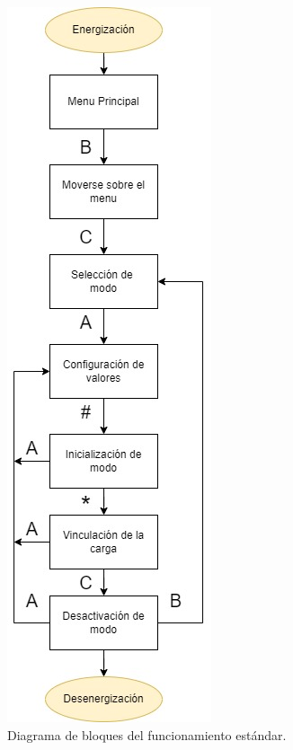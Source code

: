 \begin{figure}[H]
    \centering
    \includegraphics[scale=0.7]{./imagenes/funcionamiento_normal.jpg}
    \caption{Diagrama de bloques del funcionamiento estándar.}
    \label{F:funcionamiento_normal}
\end{figure}

